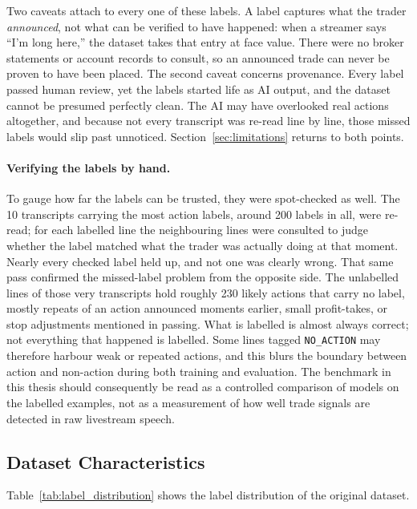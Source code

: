 Two caveats attach to every one of these labels. A label captures what the trader \emph{announced}, not what can be verified to have happened: when a streamer says ``I'm long here,'' the dataset takes that entry at face value. There were no broker statements or account records to consult, so an announced trade can never be proven to have been placed. The second caveat concerns provenance. Every label passed human review, yet the labels started life as AI output, and the dataset cannot be presumed perfectly clean. The AI may have overlooked real actions altogether, and because not every transcript was re-read line by line, those missed labels would slip past unnoticed. Section~\ref{sec:limitations} returns to both points.

\paragraph{Verifying the labels by hand.}\label{sec:label_verification}
To gauge how far the labels can be trusted, they were spot-checked as well. The 10 transcripts carrying the most action labels, around 200 labels in all, were re-read; for each labelled line the neighbouring lines were consulted to judge whether the label matched what the trader was actually doing at that moment. Nearly every checked label held up, and not one was clearly wrong. That same pass confirmed the missed-label problem from the opposite side. The unlabelled lines of those very transcripts hold roughly 230 likely actions that carry no label, mostly repeats of an action announced moments earlier, small profit-takes, or stop adjustments mentioned in passing. What is labelled is almost always correct; not everything that happened is labelled. Some lines tagged \texttt{NO\_ACTION} may therefore harbour weak or repeated actions, and this blurs the boundary between action and non-action during both training and evaluation. The benchmark in this thesis should consequently be read as a controlled comparison of models on the labelled examples, not as a measurement of how well trade signals are detected in raw livestream speech.

\subsection{Dataset Characteristics}
\label{sec:dataset_characteristics}

Table~\ref{tab:label_distribution} shows the label distribution of the original dataset.

